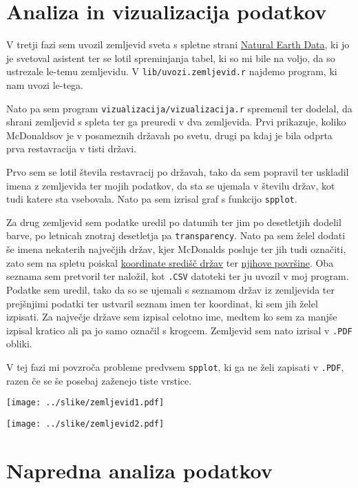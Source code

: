 \documentclass[11pt,a4paper]{article}
\begin{document}
\newpage

\section{Analiza in vizualizacija podatkov}


V tretji fazi sem uvozil zemljevid sveta s spletne strani \href{http://www.naturalearthdata.com/http//www.naturalearthdata.com/download/50m/cultural/ne_50m_admin_0_countries.zip}{Natural Earth Data}, ki jo je svetoval asistent ter se lotil spreminjanja tabel, ki so mi bile na voljo, da so ustrezale le-temu zemljevidu. V \verb|lib/uvozi.zemljevid.r| najdemo program, ki nam uvozi le-tega. \par

Nato pa sem program \verb|vizualizacija/vizualizacija.r| spremenil ter dodelal, da shrani zemljevid s spleta ter ga preuredi v dva zemljevida. Prvi prikazuje, koliko McDonaldsov je v posameznih državah po svetu, drugi pa kdaj je bila odprta prva restavracija v tisti državi.

Prvo sem se lotil števila restavracij po državah, tako da sem popravil ter uskladil imena z zemljevida ter mojih podatkov, da sta se ujemala v številu držav, kot tudi katere sta vsebovala. Nato pa sem izrisal graf s funkcijo \verb|spplot|. \par

Za drug zemljevid sem podatke uredil po datumih ter jim po desetletjih dodelil barve, po letnicah znotraj desetletja pa \verb|transparency|. Nato pa sem želel dodati še imena nekaterih največjih držav, kjer McDonalds posluje ter jih tudi označiti, zato sem na spletu poiskal \href{https://developers.google.com/public-data/docs/canonical/countries_csv}{koordinate središč držav} ter \href{http://simple.wikipedia.org/wiki/List_of_countries_by_area}{njihove površine}. Oba seznama sem pretvoril ter naložil, kot \verb|.CSV| datoteki ter ju uvozil v moj program. Podatke sem uredil, tako da so se ujemali s seznamom držav iz zemljevida ter prejšnjimi podatki ter ustvaril seznam imen ter koordinat, ki sem jih želel izpisati. Za največje države sem izpisal celotno ime, medtem ko sem za manjše izpisal kratico ali pa jo samo označil s krogcem. Zemljevid sem nato izrisal v \verb|.PDF| obliki. \par

V tej fazi mi povzroča probleme predvsem \verb|spplot|, ki ga ne želi zapisati v \verb|.PDF|, razen če se še posebaj zaženejo tiste vrstice. \newpage

\begin{sidewaysfigure}[ht]
	\texttt{[image: ../slike/zemljevid1.pdf]}
\end{sidewaysfigure}


\begin{sidewaysfigure}[ht]
	\texttt{[image: ../slike/zemljevid2.pdf]}
\end{sidewaysfigure}

\newpage

\section{Napredna analiza podatkov}

\begin{center}
\end{center}
\end{document}
